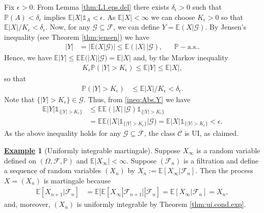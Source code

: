 \documentclass[12pt]{book}
\let\varepsilon\epsilon
\numberwithin{equation}{chapter}
\theoremstyle{plain}
\numberwithin{theorem}{section}
\theoremstyle{definition}
\newtheorem{example}[theorem]{\underline{Example}}
\numberwithin{exercise}{chapter}
\let\oldendproof\endproof
\renewenvironment{proof}[1][\proofname]{%
  \oldproof[\scshape\underline{#1}]%
}{\oldendproof}
\newcommand{\<}{\langle}
\renewcommand{\>}{\rangle}
\renewcommand{\(}{\left(}
\renewcommand{\)}{\right)}
\renewcommand{\[}{\left[}
\renewcommand{\]}{\right]}
\newcommand\Eb{\mathds{E}}
\newcommand\Ib{\mathds{1}} 	%
\newcommand\Pb{\mathds{P}}
\newcommand\Cc{\mathscr{C}}
\newcommand\Fc{\mathscr{F}}
\newcommand\Gc{\mathscr{G}}
\newcommand\eps{\varepsilon}
\newcommand\Om{\Omega}
\newcommand\del{\delta}
\begin{document}
\begin{proof}
Fix $\eps > 0$.  From Lemma \ref{thm:L1.eps.del} there exists $\del_\eps > 0$ such that $\Pb(A) < \del_\eps$ implies $\Eb|X| \Ib_A < \eps$.
As $\Eb |X|< \infty$ we can choose $K_\eps > 0$ so that $\Eb |X| / K_\eps < \del_\eps$.  Now, for any $\Gc \subseteq \Fc$, we can define $Y = \Eb(X|\Gc)$.  By Jensen's inequality (see Theorem \ref{thm:jensen}) we have
\begin{align}
|Y|
	&=	| \Eb(X|\Gc) |
	\leq \Eb(|X|\,|\Gc) , &
	& \Pb-\text{a.s.}. \label{ineq:Abs.Y}
\end{align}
Hence, we have $\Eb |Y| \leq \Eb \Eb( |X| | \Gc) = \Eb |X|$ and, by the Markov inequality
\begin{align}
K_\eps \Pb( |Y| > K_\eps)
	\leq \Eb |Y| \leq \Eb |X| ,
\end{align}
so that
\begin{align}
\Pb( |Y| > K_\eps ) 
	&\leq \Eb |X| / K_\eps < \del_\eps .
\end{align}
Note that $\{ |Y| > K_\eps \} \in \Gc$.  Thus, from \eqref{ineq:Abs.Y} we have
\begin{align}
\Eb |Y| \Ib_{\{|Y|> K_\eps\}}
	&\leq \Eb \Eb(|X|\,|\Gc) \Ib_{\{|Y|> K_\eps \}} \\
	&=	\Eb \Eb(|X| \Ib_{\{|Y|> K_\eps\}}|\Gc) 
 	 = 	\Eb |X| \Ib_{\{|Y|> K_\eps\}}
	< \eps . 
\end{align}
As the above inequality holds for any $\Gc \subseteq \Fc$, the class $\Cc$ is UI, as claimed.
\end{proof}

\begin{example}[Uniformly integrable martingale]
Suppose $X_\infty$ is a random variable defined on $(\Om,\Fc,\Pb)$ and $\Eb |X_\infty| < \infty$.  Suppose $(\Fc_n)$ is a filtration and define a sequence of random variables $(X_n)$ by $X_n := \Eb[ X_\infty | \Fc_n ]$.  Then the process $X = (X_n)$ is martingale because
\begin{align}
\Eb[ X_{n+1} | \Fc_n ]
	&=	\Eb[ \Eb[ X_\infty | \Fc_{n+1} ] | \Fc_n ]
	 =	\Eb[ X_\infty | \Fc_n ]
	=		X_n ,
\end{align}
and, moreover, $(X_n)$ is uniformly integrable by Theorem \ref{thm:ui.cond.exp}.
\end{example}


\end{document}
